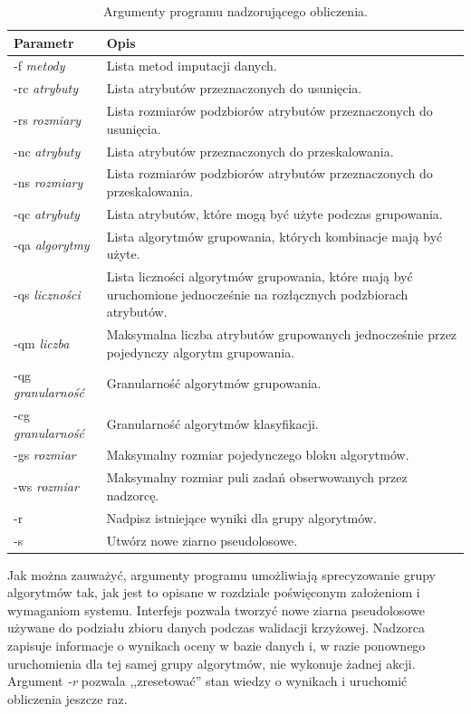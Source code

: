 \documentclass[../thesis.tex]{subfiles}
\begin{document}
\begin{table}[h]
\begin{center}
\begin{tabular}{ | l | p{110mm} | }
\hline
\rowcolor{lightgray} Parametr & Opis \\\hline

-f \emph{metody} & Lista metod imputacji danych.\\\hline
-rc \emph{atrybuty} & Lista atrybutów przeznaczonych do usunięcia.\\\hline
-rs \emph{rozmiary} & Lista rozmiarów podzbiorów atrybutów przeznaczonych do usunięcia.\\\hline
-nc \emph{atrybuty} & Lista atrybutów przeznaczonych do przeskalowania.\\\hline
-ns \emph{rozmiary} & Lista rozmiarów podzbiorów atrybutów przeznaczonych do przeskalowania.\\\hline
-qc \emph{atrybuty} & Lista atrybutów, które mogą być użyte podczas grupowania.\\\hline
-qa \emph{algorytmy} & Lista algorytmów grupowania, których kombinacje mają być użyte.\\\hline
-qs \emph{liczności} & Lista liczności algorytmów grupowania, które mają być uruchomione jednocześnie na rozłącznych podzbiorach atrybutów.\\\hline
-qm \emph{liczba} & Maksymalna liczba atrybutów grupowanych jednocześnie przez pojedynczy algorytm grupowania.\\\hline
-qg \emph{granularność} & Granularność algorytmów grupowania.\\\hline
-cg \emph{granularność} & Granularność algorytmów klasyfikacji.\\\hline
-gs \emph{rozmiar} & Maksymalny rozmiar pojedynczego bloku algorytmów.\\\hline
-ws \emph{rozmiar} & Maksymalny rozmiar puli zadań obserwowanych przez nadzorcę.\\\hline
-r & Nadpisz istniejące wyniki dla grupy algorytmów.\\\hline
-s & Utwórz nowe ziarno pseudolosowe.\\\hline

\end{tabular}
\caption{Argumenty programu nadzorującego obliczenia.}
\label{proj:table_calculate_args}
\end{center}
\end{table}

Jak można zauważyć, argumenty programu umożliwiają sprecyzowanie grupy algorytmów tak, jak jest to opisane w rozdziale poświęconym założeniom i wymaganiom systemu. Interfejs pozwala tworzyć nowe ziarna pseudolosowe używane do podziału zbioru danych podczas walidacji krzyżowej. Nadzorca zapisuje informacje o wynikach oceny w bazie danych i, w razie ponownego uruchomienia dla tej samej grupy algorytmów, nie wykonuje żadnej akcji. Argument \emph{-r} pozwala ,,zresetować'' stan wiedzy o wynikach i uruchomić obliczenia jeszcze raz.
\end{document}
